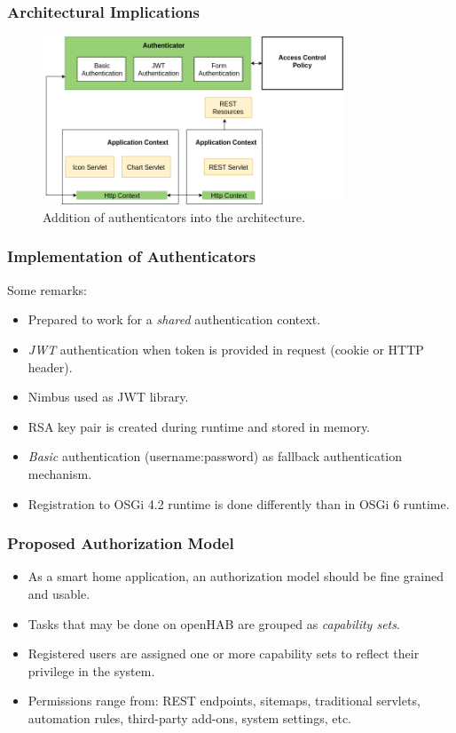 \documentclass{beamer}
\begin{document}
\begin{frame}
\frametitle{Architectural Implications}
\begin{figure} [ht] 
\begin{center}
\includegraphics[width=0.8\textwidth]{esh_arch_authenticator}
\caption{Addition of authenticators into the architecture.}
\label{fig:esh_arch_authenticator}
\end{center}
\end{figure}
\end{frame}
\begin{frame}
\frametitle{Implementation of Authenticators}
Some remarks:
\begin{itemize}
  \setlength\itemsep{1.5em}
\item Prepared to work for a \emph{shared} authentication context.
\item \emph{JWT} authentication when token is provided in request (cookie or HTTP header).
\item Nimbus used as JWT library. 
\item RSA key pair is created during runtime and stored in memory. 
\item \emph{Basic} authentication (username:password) as fallback authentication mechanism.
\item Registration to OSGi 4.2 runtime is done differently than in OSGi 6 runtime. 
\end{itemize}
\end{frame}
\begin{frame}
\frametitle{Proposed Authorization Model}
\begin{itemize}
  \setlength\itemsep{1.5em}
\item As a smart home application, an authorization model should be fine grained and usable.
\item Tasks that may be done on openHAB are grouped as \emph{capability sets}.
\item Registered users are assigned one or more capability sets to reflect their privilege in the system.
\item Permissions range from: REST endpoints, sitemaps, traditional servlets, automation rules, third-party add-ons, system settings, etc.
\end{itemize}
\end{frame}
\end{document}
